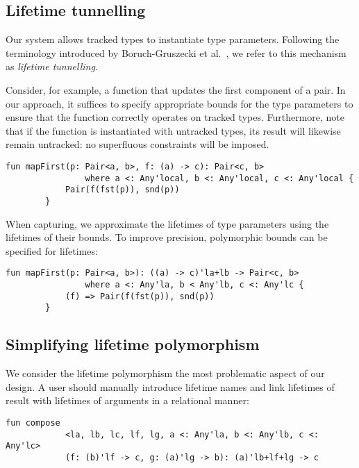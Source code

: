 \documentclass[11pt]{article}
\begin{document}
    \subsection{Lifetime tunnelling}

    Our system allows tracked types to instantiate type parameters.
    Following the terminology introduced by Boruch-Gruszecki et al.~\cite{boruch2023capturing}, we refer to this mechanism as \emph{lifetime tunnelling}.

    Consider, for example, a function that updates the first component of a pair.
    In our approach, it suffices to specify appropriate bounds for the type parameters to ensure that the function correctly operates on tracked types.
    Furthermore, note that if the function is instantiated with untracked types, its result will likewise remain untracked: no superfluous constraints will be imposed.
    \begin{lstlisting}[language=colang]
        fun mapFirst(p: Pair<a, b>, f: (a) -> c): Pair<c, b>
                where a <: Any'local, b <: Any'local, c <: Any'local {
            Pair(f(fst(p)), snd(p))
        }
    \end{lstlisting}

    When capturing, we approximate the lifetimes of type parameters using the
    lifetimes of their bounds.
    To improve precision, polymorphic bounds can
    be specified for lifetimes:
    \begin{lstlisting}[language=colang]
        fun mapFirst(p: Pair<a, b>): ((a) -> c)'la+lb -> Pair<c, b>
                where a <: Any'la, b < Any'lb, c <: Any'lc {
            (f) => Pair(f(fst(p)), snd(p))
        }
    \end{lstlisting}

    \subsection{Simplifying lifetime polymorphism} \label{subsec:lifetime-poly-enhancement}

    We consider the lifetime polymorphism the most problematic aspect of our design.
    A user should manually introduce lifetime names and link lifetimes of result with lifetimes of arguments in a relational manner:
    \begin{lstlisting}[language=colang]
        fun compose
            <la, lb, lc, lf, lg, a <: Any'la, b <: Any'lb, c <: Any'lc>
            (f: (b)'lf -> c, g: (a)'lg -> b): (a)'lb+lf+lg -> c
    \end{lstlisting}
\end{document}
